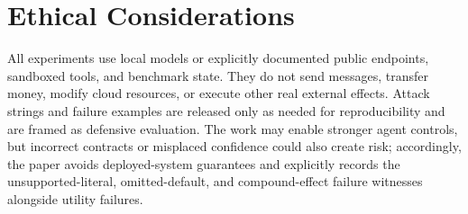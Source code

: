 \section{Ethical Considerations}

All experiments use local models or explicitly documented public endpoints, sandboxed tools, and benchmark state. They do not send messages, transfer money, modify cloud resources, or execute other real external effects. Attack strings and failure examples are released only as needed for reproducibility and are framed as defensive evaluation. The work may enable stronger agent controls, but incorrect contracts or misplaced confidence could also create risk; accordingly, the paper avoids deployed-system guarantees and explicitly records the unsupported-literal, omitted-default, and compound-effect failure witnesses alongside utility failures.
